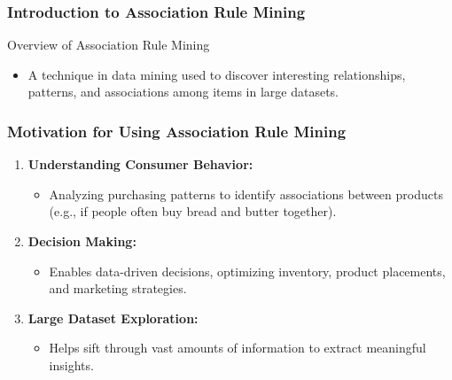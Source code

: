 \documentclass[aspectratio=169]{beamer}
\begin{document}
\frame{\titlepage}

\begin{frame}[fragile]
    \frametitle{Introduction to Association Rule Mining}
    \begin{block}{Overview of Association Rule Mining}
        \begin{itemize}
            \item A technique in data mining used to discover interesting relationships, patterns, and associations among items in large datasets.
        \end{itemize}
    \end{block}
\end{frame}

\begin{frame}[fragile]
    \frametitle{Motivation for Using Association Rule Mining}
    \begin{enumerate}
        \item \textbf{Understanding Consumer Behavior:}
        \begin{itemize}
            \item Analyzing purchasing patterns to identify associations between products (e.g., if people often buy bread and butter together).
        \end{itemize}
        
        \item \textbf{Decision Making:}
        \begin{itemize}
            \item Enables data-driven decisions, optimizing inventory, product placements, and marketing strategies.
        \end{itemize}
        
        \item \textbf{Large Dataset Exploration:}
        \begin{itemize}
            \item Helps sift through vast amounts of information to extract meaningful insights.
        \end{itemize}
    \end{enumerate}
\end{frame}
\end{document}
